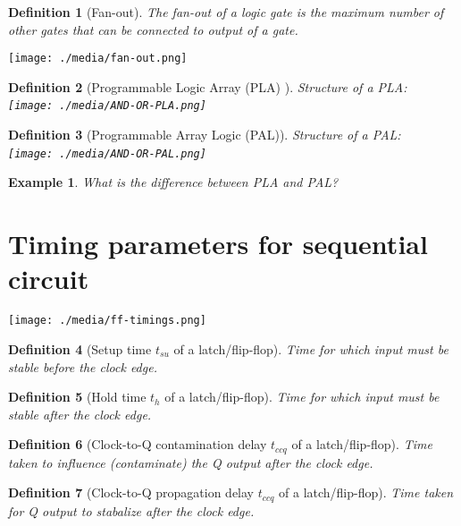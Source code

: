 \documentclass{article}
\newtheorem{example}{Example}
\newtheorem{definition}{Definition}
\begin{document}
\begin{definition}[Fan-out]
  The fan-out of a logic gate is the maximum number of other gates that can be connected
  to output of a gate.~\cite[Section~B.8.9]{stephen2022fundamentals}
\end{definition}
\texttt{[image: ./media/fan-out.png]}

\begin{definition}[Programmable Logic Array (PLA) ] Structure of a PLA:\\
  \texttt{[image: ./media/AND-OR-PLA.png]}~\cite[Section~B.6.1]{stephen2022fundamentals}
\end{definition}

\begin{definition}[Programmable Array Logic (PAL)] Structure of a PAL:\\
  \texttt{[image: ./media/AND-OR-PAL.png]}~\cite[Section~B.6.2]{stephen2022fundamentals}
\end{definition}

\begin{example}
  What is the difference between PLA and PAL?
\end{example}
\vspace{5em}

\section{Timing parameters for sequential circuit~\cite[Section~3.5]{harris2022digital}}

\texttt{[image: ./media/ff-timings.png]}
\begin{definition}[Setup time $t_{su}$ of a latch/flip-flop]
  Time for which input must be stable before the clock edge.
\end{definition}

\begin{definition}[Hold time $t_h$ of a latch/flip-flop]
  Time for which input must be stable after the clock edge.
\end{definition}

\begin{definition}[Clock-to-Q contamination delay $t_{ccq}$ of a latch/flip-flop]
  Time taken to influence (contaminate) the Q output after the clock edge.
\end{definition}

\begin{definition}[Clock-to-Q propagation delay $t_{ccq}$ of a latch/flip-flop]
  Time taken for Q output to stabalize  after the clock edge.
\end{definition}



\end{document}
